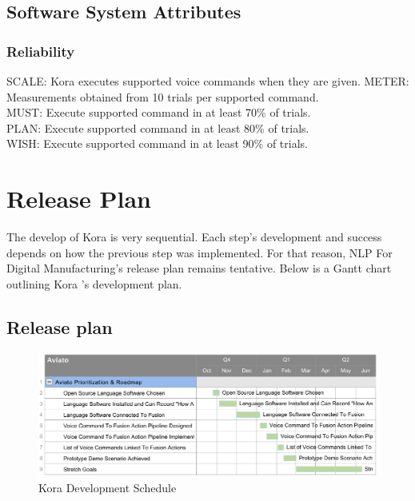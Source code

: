 \documentclass[onecolumn, draftclsnofoot,10pt, compsoc]{IEEEtran}
\def \CapstoneProjectName{NLP For Digital Manufacturing}
\def \botname{Kora }
\begin{document}
    \subsection{Software System Attributes}
	   	\subsubsection{Reliability}
	   	SCALE: \botname executes supported voice commands when they are given. 
	   	METER: Measurements obtained from 10 trials per supported command.\\
	   	MUST: Execute supported command in at least 70\% of trials.\\
	   	PLAN: Execute supported command in at least 80\% of trials.\\
        WISH: Execute supported command in at least 90\% of trials.\\
   
\section{Release Plan}
	The develop of \botname is very sequential. Each step's development and success depends on how the previous step was implemented. For that reason, \CapstoneProjectName's release plan remains tentative. Below is a Gantt chart outlining \botname's development plan.
    \subsection{Release plan}
    	\begin{figure}[H]
    		\includegraphics[width=1\textwidth]{ganttChart.eps}
    		\centering
    		\caption{\botname Development Schedule}
   			\label{fig:developmentSchedule1}
    	\end{figure}


% 
%
\end{document}
